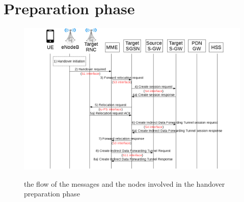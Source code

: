 \section{Preparation phase}
\begin{figure}[htb]
	\centering
	\includegraphics[width=1\linewidth]{img/preparation-phase.png}
	\label{fig:preparation-phase}
	\caption{the flow of the messages and the nodes involved in the
	handover preparation phase}
\end{figure}

